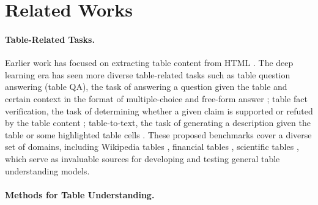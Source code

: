 \documentclass[11pt]{article}
\begin{document}
\section{Related Works}

\paragraph{Table-Related Tasks.}


Earlier work has focused on extracting table content from HTML \citep{chen-etal-2000-mining, tengli-etal-2004-learning}.
The deep learning era has seen more diverse table-related tasks such as table question answering (table QA), the task of answering a question given the table and certain context in the format of multiple-choice \citep{jauhar2016tabmcq} and free-form answer \citep{nan-etal-2022-fetaqa}; 
table fact verification, the task of determining whether a given claim is supported or refuted by the table content \citep{chen2019tabfact, gupta-etal-2020-infotabs}; 
table-to-text, the task of generating a description given the table or some highlighted table cells \citep{parikh-etal-2020-totto}.
These proposed benchmarks cover a diverse set of domains, including Wikipedia tables \citep{parikh-etal-2020-totto}, financial tables \citep{chen-etal-2021-finqa}, scientific tables \citep{moosavi2021scigen}, which serve as invaluable sources for developing and testing general table understanding models.




\paragraph{Methods for Table Understanding.}
\end{document}

